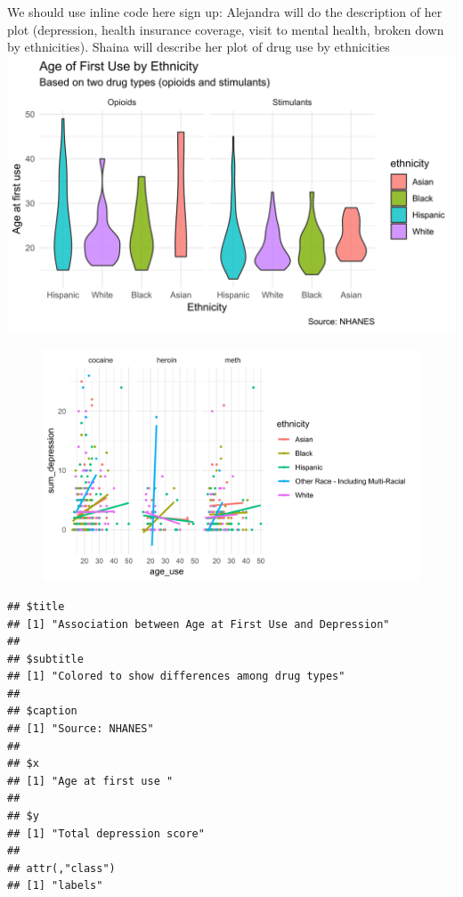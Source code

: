 \documentclass[man]{apa6}
\begin{document}
We should use inline code here sign up: Alejandra will do the
description of her plot (depression, health insurance coverage, visit to
mental health, broken down by ethnicities). Shaina will describe her
plot of drug use by ethnicities
\includegraphics{Final_Paper_Group_3_files/figure-latex/ST_plot-1.svg}

\begin{figure}
\centering
\includegraphics{Final_Paper_Group_3_files/figure-latex/ST_plot1-1.svg}
\caption{}
\end{figure}

\begin{verbatim}
## $title
## [1] "Association between Age at First Use and Depression"
## 
## $subtitle
## [1] "Colored to show differences among drug types"
## 
## $caption
## [1] "Source: NHANES"
## 
## $x
## [1] "Age at first use "
## 
## $y
## [1] "Total depression score"
## 
## attr(,"class")
## [1] "labels"
\end{verbatim}
\end{document}
